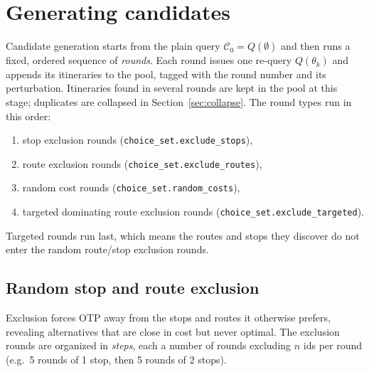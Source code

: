 \documentclass[11pt,a4paper]{article}
\newcommand{\code}[1]{\texttt{#1}}
\newcommand{\cand}{\mathcal{C}}
\begin{document}

\section{Generating candidates}
\label{sec:rounds}

Candidate generation starts from the plain query $\cand_0 = Q(\emptyset)$ and then runs a fixed,
ordered sequence of \emph{rounds}. Each round issues one re-query $Q(\theta_k)$ and appends its
itineraries to the pool, tagged with the round number and its perturbation. Itineraries found in
several rounds are kept in the pool at this stage; duplicates are collapsed in
Section~\ref{sec:collapse}. The round types run in this order:

\begin{enumerate}
  \item stop exclusion rounds (\code{choice\_set.exclude\_stops}),
  \item route exclusion rounds (\code{choice\_set.exclude\_routes}),
  \item random cost rounds (\code{choice\_set.random\_costs}),
  \item targeted dominating route exclusion rounds (\code{choice\_set.exclude\_targeted}).
\end{enumerate}

Targeted rounds run last, which means the routes and stops they discover do not enter the random route/stop exclusion rounds. 



\subsection{Random stop and route exclusion}

Exclusion forces OTP away from the stops and routes it otherwise prefers, revealing alternatives that
are close in cost but never optimal. The exclusion rounds are organized in \emph{steps}, each a number
of rounds excluding $n$ ids per round (e.g.\ 5 rounds of 1 stop, then 5 rounds of 2 stops).
\end{document}
